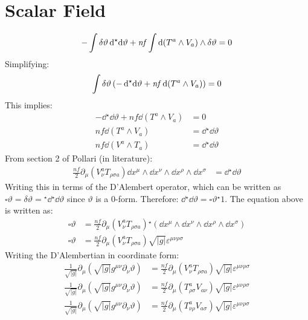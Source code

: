 \documentclass[12pt]{article}
\newcommand{\hodge}{{^\star}}
\begin{document}
\section{Scalar Field}
\begin{align*}
  - \int \var{\vartheta}\dd{\hodge{\dd{\vartheta}}} + \mathit{nf} \int \dd(T^a \wedge V_a) \wedge \var{\vartheta} = 0
\end{align*}
Simplifying:
\begin{align*}
  \int \var{\vartheta} \left(-\dd{\hodge{\dd{\vartheta}}} + \mathit{nf} \dd(T^a \wedge V_a) \right) = 0
\end{align*}
This implies:
\begin{align*}
  -\dd{\hodge{\dd{\vartheta}}} + \mathit{nf} \dd(T^a \wedge V_a) &= 0 \\
  \mathit{nf} \dd(T^a \wedge V_a) &= \dd{\hodge{\dd{\vartheta}}} \\
  \mathit{nf} \dd(V^a \wedge T_a) &= \dd{\hodge{\dd{\vartheta}}}
\end{align*}
From section 2 of Pollari (in literature):
\begin{align*}
  \frac{\mathit{nf}}{2} \partial_\mu\left(V^a_\nu T_{\rho\sigma a}\right) \dd x^\mu \wedge \dd x^\nu \wedge \dd x^\rho \wedge \dd x^\sigma &= \dd{\hodge{\dd{\vartheta}}}
\end{align*}
Writing this in terms of the D'Alembert operator, which can be written as $\square \vartheta = \delta \vartheta = \hodge{\dd}\hodge{\dd\vartheta}$ since $\vartheta$ is a 0-form. Therefore: $\dd \hodge{\dd\vartheta} = \square \vartheta \hodge{1}$. The equation above is written as:
\begin{align*}
  \square \vartheta &= \frac{\mathit{nf}}{2} \partial_\mu\left(V^a_\nu T_{\rho\sigma a}\right) \hodge(\dd x^\mu \wedge \dd x^\nu \wedge \dd x^\rho \wedge \dd x^\sigma) \\
  \square \vartheta &= \frac{\mathit{nf}}{2} \partial_\mu\left(V^a_\nu T_{\rho\sigma a}\right) \sqrt{|g|}\varepsilon^{\mu\nu\rho\sigma}
\end{align*}
Writing the D'Alembertian in coordinate form:
\begin{align*}
  \frac{1}{\sqrt{|g|}} \partial_\mu\left(\sqrt{|g|}g^{\mu\nu}\partial_\nu \vartheta \right) &= \frac{\mathit{nf}}{2} \partial_\mu\left(V^a_\nu T_{\rho\sigma a}\right) \sqrt{|g|}\varepsilon^{\mu\nu\rho\sigma} \\
  \frac{1}{\sqrt{|g|}} \partial_\mu\left(\sqrt{|g|}g^{\mu\nu}\partial_\nu \vartheta \right) &= \frac{\mathit{nf}}{2} \partial_\mu\left(T_{\rho\sigma}^a V_{a\nu}\right) \sqrt{|g|}\varepsilon^{\mu\nu\rho\sigma} \\
  \frac{1}{\sqrt{|g|}} \partial_\mu\left(\sqrt{|g|}g^{\mu\nu}\partial_\nu \vartheta \right) &= \frac{\mathit{nf}}{2} \partial_\mu\left(T_{\nu\rho}^a V_{a\sigma}\right) \sqrt{|g|}\varepsilon^{\mu\nu\rho\sigma}
\end{align*}
\end{document}
